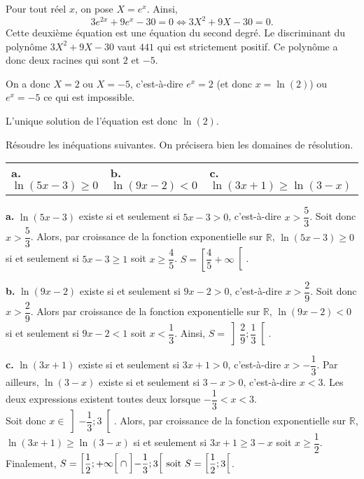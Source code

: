 \documentclass[11pt,fleqn, openany]{book} %
\begin{document}
\begin{solution}Pour tout réel $x$, on pose $X=e^x$. Ainsi, 
\[3e^{2x}+9e^x-30=0 \Leftrightarrow 3X^2+9X-30=0.\]
Cette deuxième équation est une équation du second degré. Le discriminant du polynôme $3X^2+9X-30$ vaut $441$ qui est strictement positif. Ce polynôme a donc deux racines qui sont $2$ et $-5$.

On a donc $X=2$ ou $X=-5$, c'est-à-dire $e^x = 2$ (et donc $x=\ln(2)$) ou $e^x=-5$ ce qui est impossible.

L'unique solution de l'équation est donc $\ln(2)$.\end{solution}




\begin{exercise}Résoudre les inéquations suivantes. On précisera bien les domaines de résolution.

\begin{tabularx}{\linewidth}{XXX}\textbf{a.} $\ln(5x-3) \geqslant 0$ & \textbf{b.} $\ln(9x-2) < 0$ &\textbf{c.}  $\ln(3x+1) \geqslant \ln(3-x)$\end{tabularx}\end{exercise}

\begin{solution}\textbf{a.} $\ln(5x-3)$ existe si et seulement si $5x-3>0$, c'est-à-dire $x >\dfrac{5}{3}$. Soit donc \(x > \dfrac{5}{3}\). Alors, par croissance de la fonction exponentielle sur $\mathbb{R}$, \(\ln(5x-3) \geqslant 0\) si et seulement si \(5x-3 \geqslant 1\) soit \(x\geqslant \dfrac{4}{5}\). \(S = \left[\dfrac{4}{5} +\infty\right[\).

\textbf{b.} $\ln(9x-2)$ existe si et seulement si $9x-2>0$, c'est-à-dire $x >\dfrac{2}{9}$. Soit donc \(x > \dfrac{2}{9}\). Alors  par croissance de la fonction exponentielle sur $\mathbb{R}$, \(\ln(9x-2) < 0\) si et seulement si \(9x-2 < 1\) soit \(x< \dfrac{1}{3}\). Ainsi, \(S=\left]\dfrac{2}{9};\dfrac{1}{3}\right[\).

\textbf{c.} $\ln(3x+1)$ existe si et seulement si $3x+1>0$, c'est-à-dire $x >-\dfrac{1}{3}$. Par ailleurs, $\ln(3-x)$ existe si et seulement si $3-x>0$, c'est-à-dire $x<3$. Les deux expressions existent toutes deux lorsque $-\dfrac{1}{3}<x<3$. \\ Soit donc \(x \in \left]-\dfrac{1}{3};3\right[\). Alors,  par croissance de la fonction exponentielle sur $\mathbb{R}$, \(\ln(3x+1) \geqslant \ln(3-x)\) si et seulement si \(3x+1 \geqslant 3-x\) soit \(x \geqslant \dfrac{1}{2}\). Finalement, \(S=\left[\dfrac{1}{2};+\infty \right[ \cap  \left]-\dfrac{1}{3};3\right[$ soit \(S=\left[\dfrac{1}{2};3\right[\).\end{solution}
\end{document}
